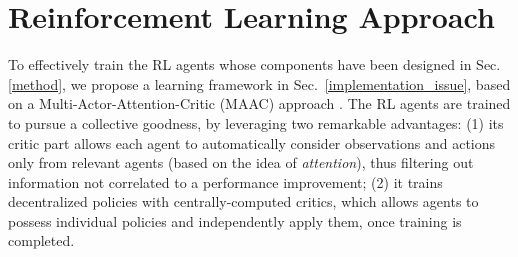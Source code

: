 \section{Reinforcement Learning Approach}
\label{learning_approach}

To effectively train the RL agents whose components have been designed in Sec. \ref{method}, we propose a learning framework in Sec.~\ref{implementation_issue}, based on a Multi-Actor-Attention-Critic (MAAC) approach \cite{iqbal2019actor}.
The RL agents are trained to pursue a collective goodness, by leveraging two remarkable advantages:
(1) its critic part allows each agent to automatically consider observations and actions only from relevant agents (based on the idea of \textit{attention}), thus filtering out information not correlated to a performance improvement; (2) it trains decentralized policies with centrally-computed critics, which allows agents to possess individual policies and independently apply them, once training is completed.


